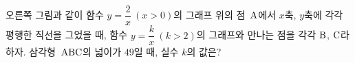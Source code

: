 \noindent\begin{minipage}[t]{0.58\linewidth}\vspace{0pt}\raggedright 오른쪽 그림과 같이 함수 $y=\dfrac{2}{x}\ (x>0)$의 그래프 위의 점~$\mathrm{A}$에서 $x$축, $y$축에 각각 평행한 직선을 그었을 때, 함수 $y=\dfrac{k}{x}\ (k>2)$의 그래프와 만나는 점을 각각 $\mathrm{B}$, $\mathrm{C}$라 하자. 삼각형~$\mathrm{ABC}$의 넓이가 $49$일 때, 실수 $k$의 값은?\end{minipage}\hfill\begin{minipage}[t]{0.4\linewidth}\vspace{0pt}\centering \resizebox{\ifdim\width>\linewidth\linewidth\else\width\fi}{!}{}\end{minipage}\par
{}
